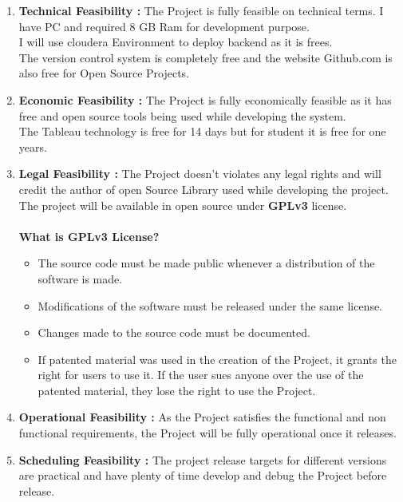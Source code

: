 \begin{enumerate}
	\item \textbf{Technical Feasibility :} The Project is fully feasible on technical terms. I have PC and required 8 GB Ram for development purpose.\\
	I will use cloudera Environment to deploy backend as it is frees.\\
	The version control system is completely free and the website Github.com is also free for Open Source Projects.
   \item \textbf{Economic Feasibility :} The Project is fully economically feasible as it has free and open source tools being used while developing the system.\\
   The Tableau technology is free for 14 days but for student it is free for one years.
   \item \textbf{Legal Feasibility :} The Project doesn't violates any legal rights and will credit the author of open Source Library used while developing the project.\\
   The project will be available in open source under \textbf{GPLv3} license.\\
   \\
   \textbf{What is GPLv3 License?}
   \begin{itemize}
   	\item The source code must be made public whenever a distribution of the software is made.
   	\item Modifications of the software must be released under the same license.
   	\item Changes made to the source code must be documented.
   	\item If patented material was used in the creation of the Project, it grants the right for users to use it. If the user sues anyone over the use of the patented material, they lose the right to use the Project.\\
   \end{itemize}
 
   \item \textbf{Operational Feasibility : } As the Project satisfies the functional and non functional requirements, the Project will be fully operational once it releases.
   
   \item \textbf{Scheduling Feasibility : } The project release targets for different versions are practical and have plenty of time develop and debug the Project before release.
\end{enumerate}

